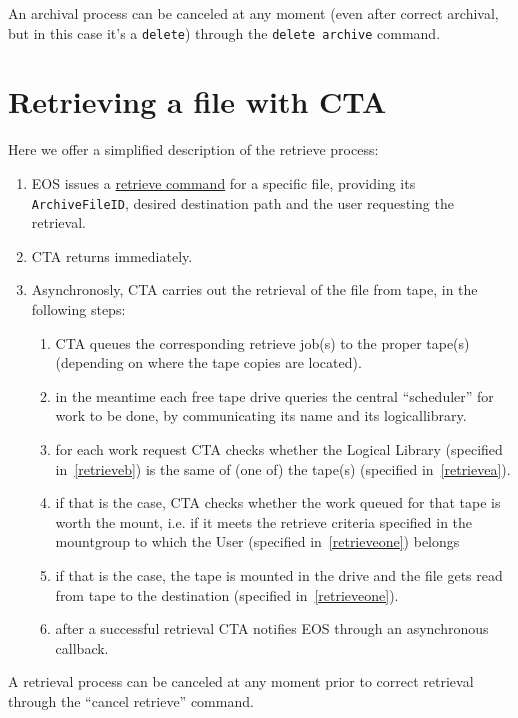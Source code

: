 An archival process can be canceled at any moment (even after correct archival, but in this case it's a {\tt delete})
through the {\tt delete archive} command.

\section{Retrieving a file with CTA}

Here we offer a simplified description of the retrieve process:

\begin{enumerate}
\item EOS issues a \hyperref[ctaeosretrieve]{retrieve command} for a specific file, providing its {\tt ArchiveFileID},
      desired destination path and the \gls{user} requesting the retrieval\label{retrieveone}.
\item CTA returns immediately.
\item Asynchronosly, CTA carries out the retrieval of the file from tape, in the following steps:
\begin{enumerate}
   \item CTA queues the corresponding retrieve job(s) to the proper tape(s) (depending on where the tape copies are
         located).\label{retrievea}
   \item in the meantime each free tape drive queries the central ``scheduler'' for work to be done, by communicating its
         name and its \gls{logicallibrary}.\label{retrieveb}
   \item for each work request CTA checks whether the Logical Library (specified in~\ref{retrieveb}) is the same of
         (one of) the tape(s) (specified in~\ref{retrievea}).
   \item if that is the case, CTA checks whether the work queued for that tape is worth the mount, i.e. if it meets the
         retrieve criteria specified in the \gls{mountgroup} to which the User (specified in~\ref{retrieveone}) belongs
   \item if that is the case, the tape is mounted in the drive and the file gets read from tape to the destination
         (specified in~\ref{retrieveone}).
   \item after a successful retrieval CTA notifies EOS through an asynchronous callback.
\end{enumerate}
\end{enumerate}

A retrieval process can be canceled at any moment prior to correct retrieval through the ``cancel retrieve'' command.

